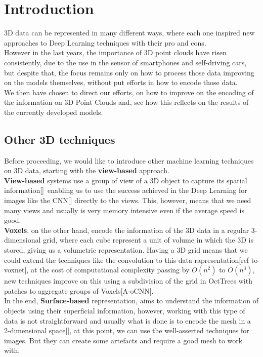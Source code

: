 \documentclass[12pt]{article}
\begin{document}
\tableofcontents
\clearpage

\section{Introduction}
3D data can be represented in many different ways, 
where each one inspired new approaches to Deep Learning techniques with their pro and cons.
\\
However in the last years, the importance of 3D point clouds have risen consistently, 
due to the use in the sensor of smartphones and self-driving cars, 
but despite that, the focus remains only on how to process those data improving on the models themselves, 
without put efforts in how to encode those data.
\\
We then have chosen to direct our efforts, 
on how to improve on the encoding of the information on 3D Point Clouds and, 
see how this reflects on the results of the currently developed models.

\subsection{Other 3D techniques}
Before proceeding, we would like to introduce other machine learning techniques on 3D data, 
starting with the \textbf{view-based} approach.
\\
\textbf{View-based} systems use a group of view of a 3D object to capture its spatial information[]\, 
enabling us to use the success achieved in the Deep Learning for images like the CNN[] directly to the views.
This, however, means that we need many views and usually is very memory intensive even if the average speed is good.
\\
\textbf{Voxels}, on the other hand, 
encode the information of the 3D data in a regular 3-dimensional grid, where each cube represent a unit of volume in which the 3D is stored, 
giving us a volumetric representation.
Having a 3D grid means that we could extend the techniques like the convolution to this data rapresentation[ref to voxnet], 
at the cost of computational complexity passing by $ O(n^2) $ to $ O(n^3) $, new techniques improve on this using a subdivision of the grid in OctTrees with patches to aggregate groups of Voxels[A-oCNN].
\\
In the end, \textbf{Surface-based} representation, 
aims to understand the information of objects using their superficial information, 
however, working with this type of data is not straightforward and usually what is done is to encode the mesh in a 2-dimensional space[], 
at this point, we can use the well-asserted techniques for images. 
But they can create some artefacts and require a good mesh to work with.  
\end{document}

